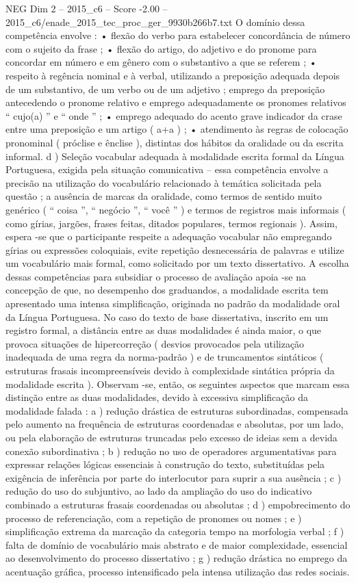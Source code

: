 \begin{textsample}{NEG Dim 2 – 2015\_c6 – Score -2.00 – 2015\_c6/enade\_2015\_tec\_proc\_ger\_9930b266b7.txt}
O domínio dessa competência envolve : • flexão do verbo para estabelecer concordância de número com o sujeito da frase ; • flexão do artigo, do adjetivo e do pronome para concordar em número e em gênero com o substantivo a que se referem ; • respeito à regência nominal e à verbal, utilizando a preposição adequada depois de um substantivo, de um verbo ou de um adjetivo ; emprego da preposição antecedendo o pronome relativo e emprego adequadamente os pronomes relativos “ cujo(a) ” e “ onde ” ; • emprego adequado do acento grave indicador da crase entre uma preposição e um artigo ( a+a ) ; • atendimento às regras de colocação pronominal ( próclise e ênclise ), distintas dos hábitos da oralidade ou da escrita informal. d ) Seleção vocabular adequada à modalidade escrita formal da Língua Portuguesa, exigida pela situação comunicativa – essa competência envolve a precisão na utilização do vocabulário relacionado à temática solicitada pela questão ; a ausência de marcas da oralidade, como termos de sentido muito genérico ( “ coisa ”, “ negócio ”, “ você ” ) e termos de registros mais informais ( como gírias, jargões, frases feitas, ditados populares, termos regionais ).
Assim, espera -se que o participante respeite a adequação vocabular não empregando gírias ou expressões coloquiais, evite repetição desnecessária de palavras e utilize um vocabulário mais formal, como solicitado por um texto dissertativo.
A escolha dessas competências para subsidiar o processo de avaliação apoia -se na concepção de que, no desempenho dos graduandos, a modalidade escrita tem apresentado uma intensa simplificação, originada no padrão da modalidade oral da Língua Portuguesa.
No caso do texto de base dissertativa, inscrito em um registro formal, a distância entre as duas modalidades é ainda maior, o que provoca situações de hipercorreção ( desvios provocados pela utilização inadequada de uma regra da norma-padrão ) e de truncamentos sintáticos ( estruturas frasais incompreensíveis devido à complexidade sintática própria da modalidade escrita ).
Observam -se, então, os seguintes aspectos que marcam essa distinção entre as duas modalidades, devido à excessiva simplificação da modalidade falada : a ) redução drástica de estruturas subordinadas, compensada pelo aumento na frequência de estruturas coordenadas e absolutas, por um lado, ou pela elaboração de estruturas truncadas pelo excesso de ideias sem a devida conexão subordinativa ; b ) redução no uso de operadores argumentativas para expressar relações lógicas essenciais à construção do texto, substituídas pela exigência de inferência por parte do interlocutor para suprir a sua ausência ; c ) redução do uso do subjuntivo, ao lado da ampliação do uso do indicativo combinado a estruturas frasais coordenadas ou absolutas ; d ) empobrecimento do processo de referenciação, com a repetição de pronomes ou nomes ; e ) simplificação extrema da marcação da categoria tempo na morfologia verbal ; f ) falta de domínio de vocabulário mais abstrato e de maior complexidade, essencial ao desenvolvimento do processo dissertativo ; g ) redução drástica no emprego da acentuação gráfica, processo intensificado pela intensa utilização das redes sociais.

\end{textsample}

